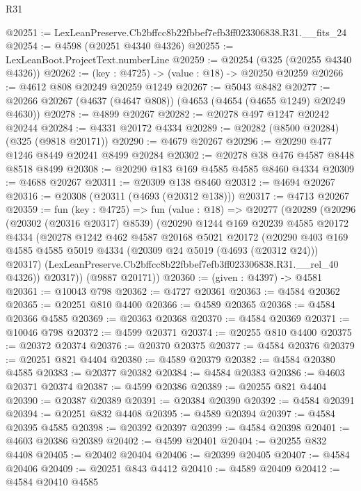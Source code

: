 \begin{lexlean}{R31}
\begin{coremodule}
@20251 := LexLeanPreserve.Cb2bffcc8b22fbbef7efb3ff023306838.R31.__fits_24
@20254 := @4598 (@20251 @4340 @4326)
@20255 := LexLeanBoot.ProjectText.numberLine
@20259 := @20254 (@325 (@20255 @4340 @4326))
@20262 := (key : @4725) -> (value : @18) -> @20250 @20259
@20266 := @4612 @808 @20249 @20259 @1249
@20267 := @5043 @8482
@20277 := @20266 @20267 (@4637 (@4647 @808)) (@4653 (@4654 (@4655 @1249) @20249 @4630))
@20278 := @4899 @20267
@20282 := @20278 @497 @1247 @20242 @20244
@20284 := @4331 @20172 @4334
@20289 := @20282 (@8500 @20284) (@325 (@9818 @20171))
@20290 := @4679 @20267
@20296 := @20290 @477 @1246 @8449 @20241 @8499 @20284
@20302 := @20278 @38 @476 @4587 @8448 @8518 @8499
@20308 := @20290 @183 @169 @4585 @4585 @8460 @4334
@20309 := @4688 @20267
@20311 := @20309 @138 @8460
@20312 := @4694 @20267
@20316 := @20308 (@20311 (@4693 (@20312 @138)))
@20317 := @4713 @20267
@20359 := fun (key : @4725) =>
  fun (value : @18) =>
  @20277
    (@20289
      (@20296
        (@20302 (@20316 @20317) @8539)
        (@20290
          @1244
          @169
          @20239
          @4585
          @20172
          @4334
          (@20278
            @1242
            @462
            @4587
            @20168
            @5021
            @20172
            (@20290
              @403
              @169
              @4585
              @4585
              @5019
              @4334
              (@20309 @24 @5019 (@4693 (@20312 @24)))
              @20317)
            (LexLeanPreserve.Cb2bffcc8b22fbbef7efb3ff023306838.R31.__rel_40 @4326))
          @20317))
      (@9887 @20171))
@20360 := (given : @4397) -> @4581
@20361 := @10043 @798
@20362 := @4727 @20361
@20363 := @4584 @20362
@20365 := @20251 @810 @4400
@20366 := @4589 @20365
@20368 := @4584 @20366 @4585
@20369 := @20363 @20368
@20370 := @4584 @20369
@20371 := @10046 @798
@20372 := @4599 @20371
@20374 := @20255 @810 @4400
@20375 := @20372 @20374
@20376 := @20370 @20375
@20377 := @4584 @20376
@20379 := @20251 @821 @4404
@20380 := @4589 @20379
@20382 := @4584 @20380 @4585
@20383 := @20377 @20382
@20384 := @4584 @20383
@20386 := @4603 @20371 @20374
@20387 := @4599 @20386
@20389 := @20255 @821 @4404
@20390 := @20387 @20389
@20391 := @20384 @20390
@20392 := @4584 @20391
@20394 := @20251 @832 @4408
@20395 := @4589 @20394
@20397 := @4584 @20395 @4585
@20398 := @20392 @20397
@20399 := @4584 @20398
@20401 := @4603 @20386 @20389
@20402 := @4599 @20401
@20404 := @20255 @832 @4408
@20405 := @20402 @20404
@20406 := @20399 @20405
@20407 := @4584 @20406
@20409 := @20251 @843 @4412
@20410 := @4589 @20409
@20412 := @4584 @20410 @4585

\end{coremodule}
\end{lexlean}
